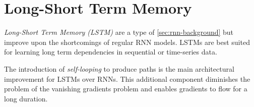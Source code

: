     \section{Long-Short Term Memory}
    \label{sec:lstm-background}

        \emph{Long-Short Term Memory (LSTM)} are a type of \ref{sec:rnn-background} but improve upon the shortcomings of regular RNN models.
        LSTMs are best suited for learning long term dependencies in sequential or time-series data.

        The introduction of \emph{self-looping} to produce paths is the main architectural improvement for LSTMs over RNNs. This additional component diminishes the problem of the vanishing gradients problem and enables gradients to flow for a long duration.